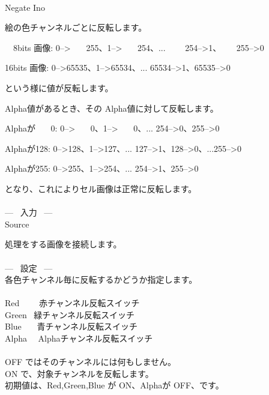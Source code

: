 \documentclass[a4paper,12pt]{article}
\begin{document}
\thispagestyle{empty}

\Large
\noindent \\
Negate Ino\medskip
\par
\normalsize
絵の色チャンネルごとに反転します。\\
\par
\ \ 8bits 画像: 0--> \ \ \ 255、1--> \ \ \, 254、... \ \ \ \ 254-->1、 \ \ \, 255-->0\par
16bits 画像: 0-->65535、1-->65534、... 65534-->1、65535-->0\par
という様に値が反転します。\\
\par
Alpha値があるとき、その Alpha値に対して反転します。\par
Alphaが \ \ \ 0: 0--> \ \ \, 0、1--> \ \ \ 0、... 254-->0、255-->0\par
Alphaが128: 0-->128、1-->127、... 127-->1、128-->0、...255-->0\par
Alphaが255: 0-->255、1-->254、... 254-->1、255-->0\par
となり、これによりセル画像は正常に反転します。\\
\\
--- \ 入力 \ ---\\
Source\par
処理をする画像を接続します。\\
\\
--- \ 設定 \ ---\\
各色チャンネル毎に反転するかどうか指定します。\\
\\
Red \ \ \ \, 赤チャンネル反転スイッチ\\
Green \ 緑チャンネル反転スイッチ\\
Blue \ \ \, 青チャンネル反転スイッチ\\
Alpha \ \ Alphaチャンネル反転スイッチ\\
\\
OFF ではそのチャンネルには何もしません。\\
ON で、対象チャンネルを反転します。\\
初期値は、Red,Green,Blue が ON、Alphaが OFF、です。
\end{document}
